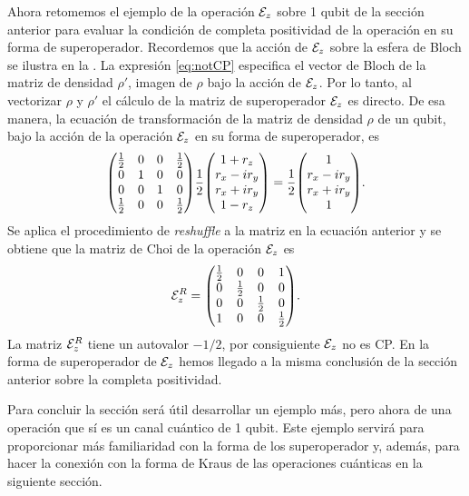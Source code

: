 Ahora retomemos el ejemplo de la operación $\mathcal{E}_z$ 
sobre 1 qubit de la sección anterior para evaluar la condición de 
completa positividad de la operación en su forma de superoperador. 
Recordemos que la acción de $\mathcal{E}_z$ sobre la 
esfera de Bloch se ilustra en la .
La expresión \eqref{eq:notCP} especifica el vector de Bloch
de la matriz de densidad $\rho'$, imagen de $\rho$ bajo la acción de $\mathcal{E}_z$.
Por lo tanto, al vectorizar $\rho$ y $\rho'$ el cálculo 
de la matriz de superoperador $\mathcal{E}_z$ es directo. 
De esa manera, la ecuación de transformación 
de la matriz de densidad $\rho$ de un qubit, bajo la
acción de la operación $\mathcal{E}_z$ en su forma de superoperador, es
\begin{align}
\mqty(
\frac{1}{2} & 0 & 0 & \frac{1}{2} \\
0 & 1 & 0 & 0 \\
0 & 0 & 1 & 0 \\
\frac{1}{2} & 0 & 0 & \frac{1}{2} \\
)
\frac{1}{2}
\mqty(
1+r_z\\r_x-ir_y\\r_x+ir_y\\1-r_z
)
=
\frac{1}{2}
\mqty(
1\\r_x-ir_y\\r_x+ir_y\\1
).
\end{align}
Se aplica el procedimiento de \textit{reshuffle} a la matriz en la ecuación 
anterior y se obtiene que la matriz de Choi de la operación $\mathcal{E}_z$ es
\begin{align}
\E_z^R=
\mqty(
\frac{1}{2} & 0 & 0 & 1 \\
0 & \frac{1}{2} & 0 & 0 \\
0 & 0 & \frac{1}{2} & 0 \\
1 & 0 & 0 & \frac{1}{2} 
).
\end{align}
La matriz $\mathcal{E}_z^R$ tiene un autovalor $-1/2$, 
por consiguiente $\mathcal{E}_z$ no es CP. 
En la forma de superoperador de $\mathcal{E}_z$ hemos llegado a la misma
conclusión de la sección anterior sobre la 
completa positividad.

Para concluir la sección será útil desarrollar un ejemplo más, 
pero ahora de una operación que sí es un canal cuántico de 1 qubit. Este 
ejemplo servirá para proporcionar más familiaridad con la forma de 
los superoperador y, además, para hacer la conexión con 
la forma de Kraus de las operaciones cuánticas en la siguiente sección.

